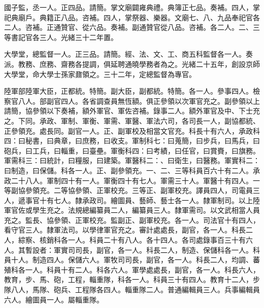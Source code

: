 \begin{pinyinscope}
國子監，丞一人。正四品。請簡。掌文廟闢雍典禮。典簿正七品。奏補。四人，掌祀典廟戶。典籍正八品。咨補。四人，掌祭器、樂器。文廟七、八、九品奉祀官各二人。咨補。正通贊官、從六品。奏補。副通贊官從八品。咨補。各二人。二、三等書記官各三人。光緒三十二年置。

大學堂，總監督一人。正三品。請簡。經、法、文、工、商五科監督各一人。奏派。教務、庶務、齋務各提調，俱延聘通曉學務者為之。光緒二十五年，創設京師大學堂，命大學士孫家鼐領之。三十二年，定總監督為專官。

陸軍部陸軍大臣，正都統。特簡。副大臣，副都統。特簡。各一人。參事四人。檢察官八人。部副官四人。各省調查員無恆額。俱正參領以次軍官充之。副參領以上請簡，協參領以下奏補，額外軍官、軍佐咨補。錄事二人。額外軍官及中、下士充之。下同。承政、軍制、軍衡、軍需、軍醫、軍法六司，各司長一人，副協都統、正參領充。處長同。副官一人。正、副軍校及相當文官充。科長十有六人，承政科四：曰秘書，曰典章，曰庶務，曰收支。軍制科七：曰蒐簡，曰步兵，曰馬兵，曰砲兵，曰工兵，曰輜重，曰臺壘。軍衡科四：曰考績，曰任官，曰賞賚，曰旗務。軍需科三：曰統計，曰糧服，曰建築。軍醫科二：、曰衛生，曰醫務。軍實科二：曰制造，曰保儲。科各一人。正、副參領充。一、二、三等科員百六十有二人。承政二十八人。軍制四十有一人。軍衡四十有七人。軍需三十人。軍醫十有四人。一等副協參領充。二等協參領、正軍校充。三等正、副軍校充。譯員四人，司電員三人，遞事官十有七人。隸承政司。繪圖員、藝師、藝士各一人。隸軍制司。以上陸軍官佐或學生充之。法規總編纂員二人，編纂員三人。隸軍需司。以文武相當人員充之。監長、協參領、正軍校充。監副正、副軍校充。各一人。司法官十有四人，看守官三人。隸軍法司。以學律軍官充之。審計處處長，副官，各一人。科長二人，綜察、核銷科各一人。科員二十有八人。各十四人。各司處錄事百三十有六人。其暫設者：軍實司司長，副官，各一人。科長二人，制造、保儲科各一人。科員十人。制造四人。保儲六人。軍牧司司長，副官，各一人。科長二人，均調、蕃殖科各一人。科員十有二人。科各六人。軍學處處長，副官，各一人。科長六人，教育，步、馬、砲，工程，輜重隊，科各一人。科員三十有四人。教育十二人，步隊八人，馬隊、砲兵、工程隊各四人。輜重隊二人。普通編輯員三人。兵事編輯員六人。繪圖員一人。屬輜重隊。


\end{pinyinscope}

